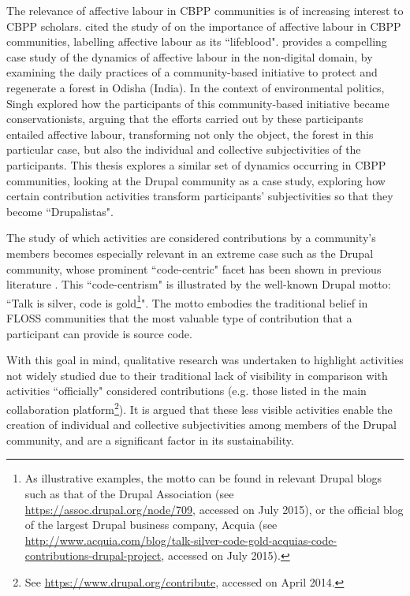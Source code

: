 The relevance of affective labour in CBPP communities is of increasing interest to CBPP scholars. \textcite{Bollier2014} cited the study of \textcite{Singh2013} on the importance of affective labour in CBPP communities, labelling affective labour as its ``lifeblood". \textcite{Singh2013} provides a compelling case study of the dynamics of affective labour in the non-digital domain, by examining the daily practices of a community-based initiative to protect and regenerate a forest in Odisha (India). In the context of environmental politics, Singh explored how the participants of this community-based initiative became conservationists, arguing that the efforts carried out by these participants entailed affective labour, transforming not only the object, the forest in this particular case, but also the individual and collective subjectivities of the participants. This thesis explores a similar set of dynamics occurring in CBPP communities, looking at the Drupal community as a case study, exploring how certain contribution activities transform participants' subjectivities so that they become ``Drupalistas".

The study of which activities are considered contributions by a community's members becomes especially relevant in an extreme case such as the Drupal community, whose prominent ``code-centric" facet has been shown in previous literature \parencite{Zilouchian2011, Sims2013}. This ``code-centrism" is illustrated by the well-known Drupal motto: ``Talk is silver, code is gold\footnote{As illustrative examples, the motto can be found in relevant Drupal blogs such as that of the Drupal Association (see \url{https://assoc.drupal.org/node/709}, accessed on  July 2015), or the official blog of the largest Drupal business company, Acquia (see \url{http://www.acquia.com/blog/talk-silver-code-gold-acquias-code-contributions-drupal-project}, accessed on  July 2015).}". The motto embodies the traditional belief in FLOSS communities that the most valuable type of contribution that a participant can provide is source code.

With this goal in mind, qualitative research was undertaken to highlight activities not widely studied due to their traditional lack of visibility in comparison with activities ``officially" considered contributions (e.g. those listed in the main collaboration platform\footnote{See \url{https://www.drupal.org/contribute}, accessed on  April 2014.}). It is argued that these less visible activities enable the creation of individual and collective subjectivities among members of the Drupal community, and are a significant factor in its sustainability.

